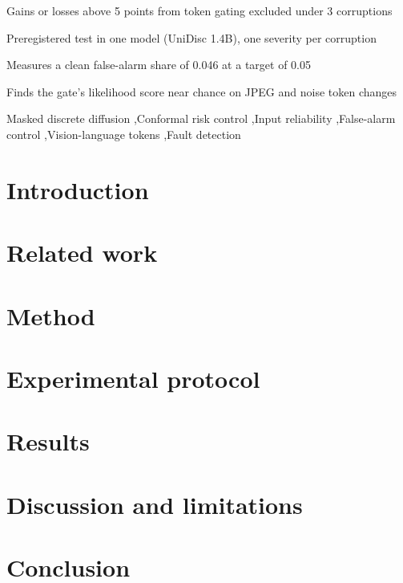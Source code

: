 \documentclass[preprint,12pt]{elsarticle}
\theoremstyle{plain}
\theoremstyle{definition}
\begin{document}
\begin{frontmatter}
\begin{highlights}
\item Gains or losses above 5 points from token gating excluded under 3 corruptions
\item Preregistered test in one model (UniDisc 1.4B), one severity per corruption
\item Measures a clean false-alarm share of 0.046 at a target of 0.05
\item Finds the gate's likelihood score near chance on JPEG and noise token changes
\end{highlights}

\begin{keyword}
Masked discrete diffusion \sep Conformal risk control \sep Input reliability \sep False-alarm control \sep Vision-language tokens \sep Fault detection
\end{keyword}

\end{frontmatter}

\section{Introduction}\label{sec:intro}


\section{Related work}\label{sec:related}


\section{Method}\label{sec:method}


\section{Experimental protocol}\label{sec:protocol}


\section{Results}\label{sec:results}


\section{Discussion and limitations}\label{sec:discussion}


\section{Conclusion}\label{sec:conclusion}




\appendix




\end{document}
